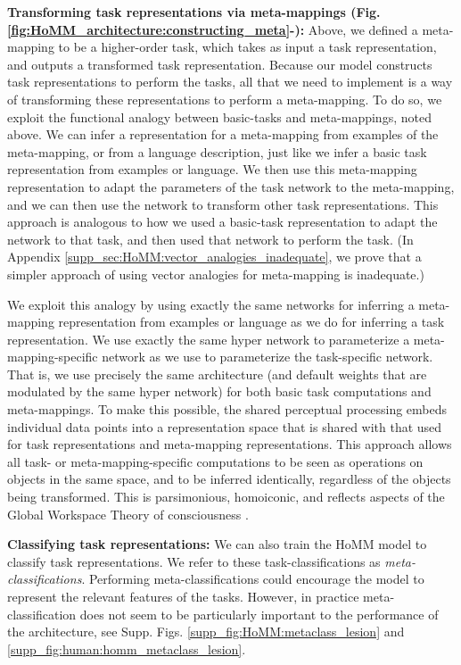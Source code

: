 \textbf{Transforming task representations via meta-mappings (Fig. \ref{fig:HoMM_architecture:constructing_meta}-):} Above, we defined a meta-mapping to be a higher-order task, which takes as input a task representation, and outputs a transformed task representation. Because our model constructs task representations to perform the tasks, all that we need to implement is a way of transforming these representations to perform a meta-mapping. To do so, we exploit the functional analogy between basic-tasks and meta-mappings, noted above. We can infer a representation for a meta-mapping from examples of the meta-mapping, or from a language description, just like we infer a basic task representation from examples or language. We then use this meta-mapping representation to adapt the parameters of the task network to the meta-mapping, and we can then use the network to transform other task representations. This approach is analogous to how we used a basic-task representation to adapt the network to that task, and then used that network to perform the task. (In Appendix \ref{supp_sec:HoMM:vector_analogies_inadequate}, we prove that a simpler approach of using vector analogies for meta-mapping is inadequate.) 

We exploit this analogy by using exactly the same networks for inferring a meta-mapping representation from examples or language as we do for inferring a task representation. We use exactly the same hyper network to parameterize a meta-mapping-specific network as we use to parameterize the task-specific network. That is, we use precisely the same architecture (and default weights that are modulated by the same hyper network) for both basic task computations and meta-mappings. To make this possible, the shared perceptual processing embeds individual data points into a representation space that is shared with that used for task representations and meta-mapping representations. This approach allows all task- or meta-mapping-specific computations to be seen as operations on objects in the same space, and to be inferred identically, regardless of the objects being transformed. This is parsimonious, homoiconic, and reflects aspects of the Global Workspace Theory of consciousness \citep{Baars2005}.   

\textbf{Classifying task representations:} We can also train the HoMM model to classify task representations. We refer to these task-classifications as \emph{meta-classifications}. Performing meta-classifications could encourage the model to represent the relevant features of the tasks. However, in practice meta-classification does not seem to be particularly important to the performance of the architecture, see Supp. Figs. \ref{supp_fig:HoMM:metaclass_lesion} and \ref{supp_fig:human:homm_metaclass_lesion}.


